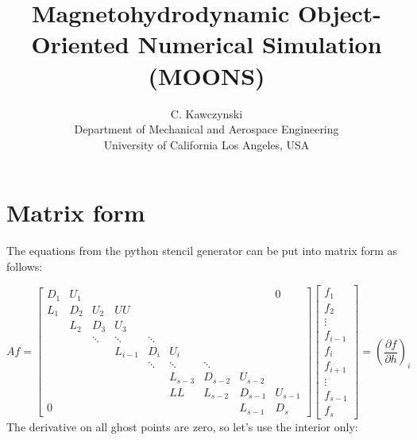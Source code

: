 \documentclass[landscape]{article}
\begin{document}
\doublespacing
\title{Magnetohydrodynamic Object-Oriented Numerical Simulation (MOONS)}
\author{C. Kawczynski \\
Department of Mechanical and Aerospace Engineering \\
University of California Los Angeles, USA\\
}
\maketitle

\section{Matrix form}
The equations from the python stencil generator can be put into matrix form as follows:

\[ Af = \left[
\begin{array}{ccccccccc}
D_{1} & U_{1} &  &   &   &   &   &   & 0 \\
L_{1} & D_{2} & U_{2} & UU  &   &   &   &   &   \\
  & L_{2} & D_{3} & U_{3} &   &   &   &   &   \\
  &   & \ddots & \ddots & \ddots &   &   &   &   \\
  &   &   & L_{i-1} & D_{i} & U_{i} &   &   &   \\
  &   &   &   & \ddots & \ddots & \ddots &   &   \\
  &   &   &   &   & L_{s-3} & D_{s-2} & U_{s-2} &   \\
  &   &   &   &   & LL & L_{s-2} & D_{s-1} & U_{s-1} \\
0 &   &   &   &   &   &  & L_{s-1} & D_{s}
\end{array} \right] \left[ \begin{array}{c}
f_{1} \\ f_{2} \\ \vdots \\ f_{i-1} \\ f_{i} \\ f_{i+1} \\ \vdots \\ f_{s-1} \\ f_{s}
\end{array} \right] 
= \left( \frac{\partial f}{\partial h} \right)_{i} 
\]
The derivative on all ghost points are zero, so let's use the interior only:
\end{document}
